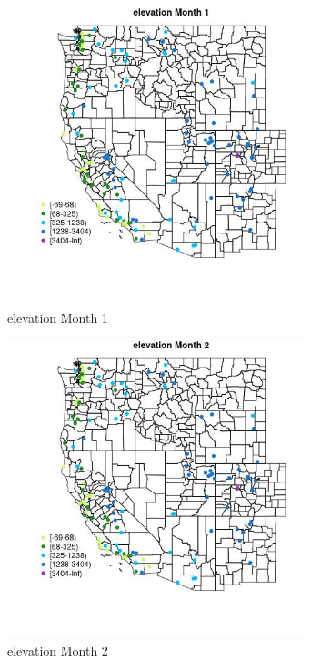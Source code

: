 \begin{figure} 
\centering  
\includegraphics[width=0.77\textwidth]{Code_Outputs/Report_ML_input_PM25_Step4_part_e_de_duplicated_aveswNAs_MapObsMo1elevation.jpg} 
\caption{\label{fig:Report_ML_input_PM25_Step4_part_e_de_duplicated_aveswNAsMapObsMo1elevation}elevation Month 1} 
\end{figure} 
 

\begin{figure} 
\centering  
\includegraphics[width=0.77\textwidth]{Code_Outputs/Report_ML_input_PM25_Step4_part_e_de_duplicated_aveswNAs_MapObsMo2elevation.jpg} 
\caption{\label{fig:Report_ML_input_PM25_Step4_part_e_de_duplicated_aveswNAsMapObsMo2elevation}elevation Month 2} 
\end{figure} 
 

